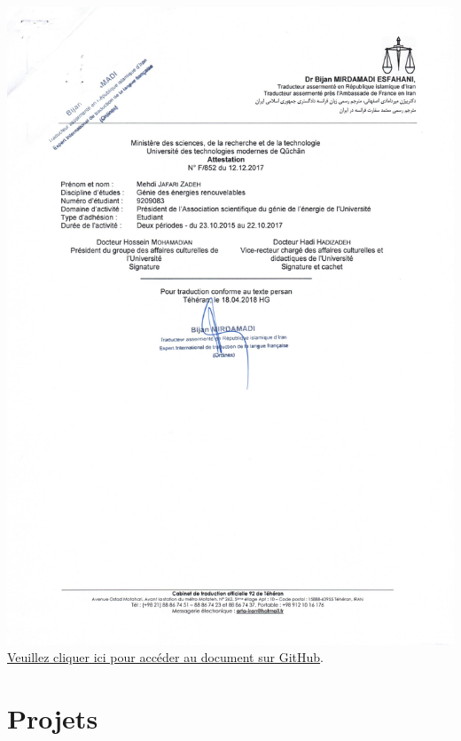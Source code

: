 \documentclass{article}
\begin{document}
        \begin{center}
            \includegraphics[width=\textwidth,height=\textheight,keepaspectratio]{../Document/Work Experience/Director of the Energy Engineering Association/12-12-2017 attestation 02.jpg}
            \footnotesize
             \href{https://github.com/jafarizadeh/CV---lettre/tree/079f60796b41475881d7ba4a70abc3254d3dd466/Document/Work%20Experience/Director%20of%20the%20Energy%20Engineering%20Association}{Veuillez cliquer ici pour accéder au document sur GitHub}.
        \end{center}

 

    \section{Projets}
\end{document}
